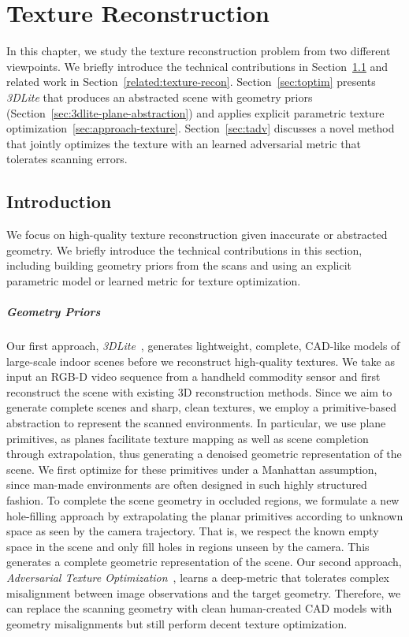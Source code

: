 \chapter{Texture Reconstruction}
\label{chapter:texture-recon}
In this chapter, we study the texture reconstruction problem from two different viewpoints. We briefly introduce the technical contributions in Section~\ref{sec:texturerecon-intro} and related work in Section~\ref{related:texture-recon}. Section~\ref{sec:toptim} presents \emph{3DLite} that produces an abstracted scene with geometry priors (Section~\ref{sec:3dlite-plane-abstraction}) and applies explicit parametric texture optimization~\ref{sec:approach-texture}. Section~\ref{sec:tadv} discusses a novel method that jointly optimizes the texture with an learned adversarial metric that tolerates scanning errors.

\section{Introduction}
\label{sec:texturerecon-intro}
We focus on high-quality texture reconstruction given inaccurate or abstracted geometry. We briefly introduce the technical contributions in this section, including building geometry priors from the scans and using an explicit parametric model or learned metric for texture optimization.

\paragraph*{Geometry Priors}
Our first approach, \emph{3DLite}~\cite{huang20173dlite}, generates lightweight, complete, CAD-like models of large-scale indoor scenes before we reconstruct high-quality textures.
%
We take as input an RGB-D video sequence from a handheld commodity sensor and first reconstruct the scene with existing 3D reconstruction methods.
Since we aim to generate complete scenes and sharp, clean textures, we employ a primitive-based abstraction to represent the scanned environments.
In particular, we use plane primitives, as planes facilitate texture mapping as well as scene completion through extrapolation, thus generating a denoised geometric representation of the scene.
%
We first optimize for these primitives under a Manhattan assumption, since man-made environments are often designed in such highly structured fashion.
To complete the scene geometry in occluded regions, we formulate a new hole-filling approach by extrapolating the planar primitives according to unknown space as seen by the camera trajectory.
That is, we respect the known empty space in the scene and only fill holes in regions unseen by the camera.
This generates a complete geometric representation of the scene.
%
Our second approach, \emph{Adversarial Texture Optimization}~\cite{huang2020adversarial}, learns a deep-metric that tolerates complex misalignment between image observations and the target geometry. Therefore, we can replace the scanning geometry with clean human-created CAD models with geometry misalignments but still perform decent texture optimization.

